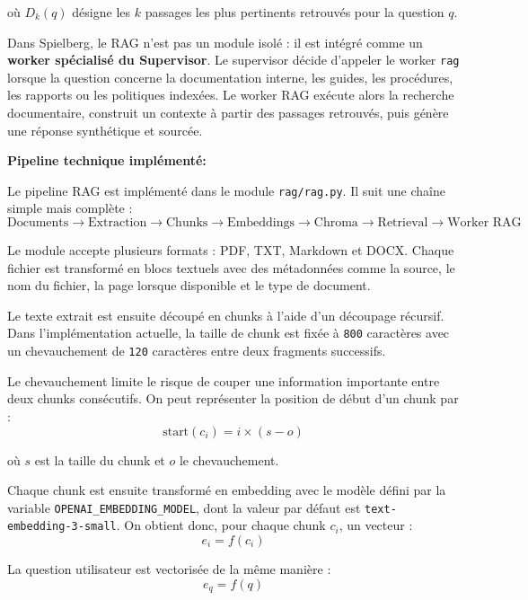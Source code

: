 \documentclass[a4paper,11pt,english,openany]{book}
\begin{document}
où $D_k(q)$ désigne les $k$ passages les plus pertinents retrouvés pour la question $q$.

Dans Spielberg, le RAG n'est pas un module isolé : il est intégré comme un \textbf{worker spécialisé du Supervisor}. Le supervisor décide d'appeler le worker \texttt{rag} lorsque la question concerne la documentation interne, les guides, les procédures, les rapports ou les politiques indexées. Le worker RAG exécute alors la recherche documentaire, construit un contexte à partir des passages retrouvés, puis génère une réponse synthétique et sourcée.

\textbf{Pipeline technique implémenté:}

Le pipeline RAG est implémenté dans le module \texttt{rag/rag.py}. Il suit une chaîne simple mais complète :
\begin{equation}
\text{Documents} \rightarrow \text{Extraction} \rightarrow \text{Chunks} \rightarrow \text{Embeddings} \rightarrow \text{Chroma} \rightarrow \text{Retrieval} \rightarrow \text{Worker RAG}
\end{equation}

 Le module accepte plusieurs formats : PDF, TXT, Markdown et DOCX. Chaque fichier est transformé en blocs textuels avec des métadonnées comme la source, le nom du fichier, la page lorsque disponible et le type de document.

Le texte extrait est ensuite découpé en chunks à l'aide d'un découpage récursif. Dans l'implémentation actuelle, la taille de chunk est fixée à \texttt{800} caractères avec un chevauchement de \texttt{120} caractères entre deux fragments successifs.

Le chevauchement limite le risque de couper une information importante entre deux chunks consécutifs. On peut représenter la position de début d'un chunk par :
\begin{equation}
\text{start}(c_i) = i \times (s - o)
\end{equation}

où $s$ est la taille du chunk et $o$ le chevauchement.

Chaque chunk est ensuite transformé en embedding avec le modèle défini par la variable \texttt{OPENAI\_EMBEDDING\_MODEL}, dont la valeur par défaut est \texttt{text-embedding-3-small}. On obtient donc, pour chaque chunk $c_i$, un vecteur :
\begin{equation}
e_i = f(c_i)
\end{equation}

La question utilisateur est vectorisée de la même manière :
\begin{equation}
e_q = f(q)
\end{equation}
\end{document}
